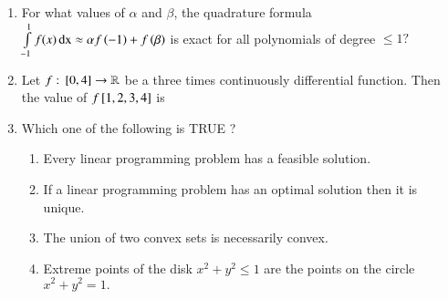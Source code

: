 \documentclass[journal]{IEEEtran}
\begin{document}
\begin{enumerate}
\item For what values of $\alpha$ and $\beta$, the quadrature formula $\int \limits_{-1}^1 f(x)\, \text{dx} \approx \alpha f\left(-1\right)+f\left(\beta\right)$ is exact for all polynomials of degree $\leq 1 ?$
\begin{enumerate}
\end{enumerate}

\item Let $f:{}\left[0,4\right] \rightarrow \mathbb R$ be a three times continuously differential function. Then the value of $f{}\left[1,2,3,4\right]$ is
\begin{enumerate}
\end{enumerate}

\item Which one of the following is TRUE ?

\begin{enumerate}
    \item Every linear programming problem has a feasible solution.
    \item If a linear programming problem has an optimal solution then it is unique.
    \item The union of two convex sets is necessarily convex.
    \item Extreme points of the disk $x^2+y^2 \leq 1$ are the points on the circle $x^2+y^2=1.$
\end{enumerate}


\end{enumerate}
\end{document}

